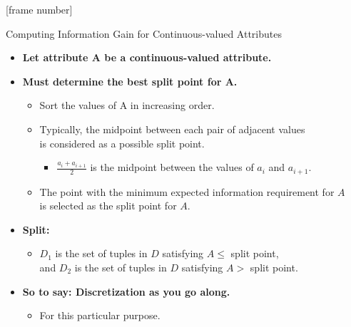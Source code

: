 \documentclass[aspectratio=169,t,table]{beamer}
\begin{document}
  {
    [frame number]
    \begin{frame}{Computing Information Gain for Continuous-valued Attributes}
      \begin{itemize}
        \item \textbf{Let attribute A be a continuous-valued attribute.}
        \item \textbf{Must determine the best split point for A.}
        \begin{itemize}
          \item Sort the values of A in increasing order.
          \item Typically, the midpoint between each pair of adjacent values \\ is considered as a possible split point.
          \begin{itemize}
            \item $\frac{a_i+a_{i+1}}{2}$ is the midpoint between the values of $a_i$ and $a_{i+1}$.
          \end{itemize}
          \item The point with the minimum expected information requirement for $A$ \\ is selected as the split point for $A$.
        \end{itemize}
        \item \textbf{Split:}
        \begin{itemize}
          \item $D_1$ is the set of tuples in $D$ satisfying $A \leq$ split point,\\
                and $D_2$ is the set of tuples in $D$ satisfying $A >$ split point.
        \end{itemize}
        \item \textbf{So to say: Discretization as you go along.}
        \begin{itemize}
          \item For this particular purpose.
        \end{itemize}
      \end{itemize}
    \end{frame}
  }
\end{document}
